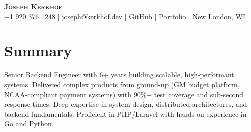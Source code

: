 \documentclass[letterpaper,11pt]{article}
\begin{document}

    \begin{center}
        \textbf{\Huge \scshape Joseph Kerkhof} \\ \vspace{3pt}
        \small
        \faMobile{} \hspace{.5pt} \href{tel:19203761248}{+1 920 376 1248}
        $|$
        \faAt{} \hspace{.5pt} \href{mailto:joseph@kerkhof.dev}{joseph@kerkhof.dev}
        $|$
        \faGithub{} \hspace{.5pt} \href{https://github.com/josephkerkhof}{GitHub}
        $|$
        \faGlobe{} \hspace{.5pt} \href{https://kerkhof.dev}{Portfolio}
        $|$
        \faMapMarker{} \hspace{.5pt} \href{https://maps.app.goo.gl/owhR2Cu3Db1u95g27}{New London, WI}
    \end{center}




    \section{Summary}
    \vspace{3pt}
    Senior Backend Engineer with 6+ years building scalable, high-performant systems.
    Delivered complex products from ground-up (GM budget platform, NCAA-compliant payment systems) with 90\%+ test coverage and sub-second response times.
    Deep expertise in system design, distributed architectures, and backend fundamentals.
    Proficient in PHP/Laravel with hands-on experience in Go and Python.

\end{document}
